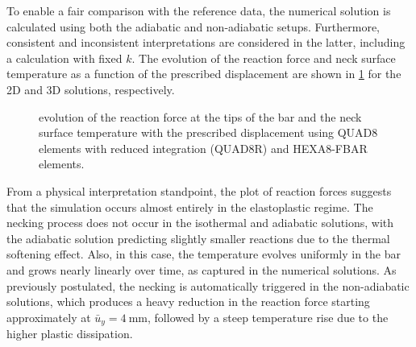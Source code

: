 To enable a fair comparison with the reference data, the numerical solution is calculated using both the adiabatic and non-adiabatic setups.
Furthermore, consistent and inconsistent interpretations are considered in the latter, including a calculation with fixed $k$.
The evolution of the reaction force and neck surface temperature as a function of the prescribed displacement are shown in \ref{fig:necking-results} for the 2D and 3D solutions, respectively.
\begin{figure}[!p]
 \centering
 \caption{evolution of the reaction force at the tips of the bar and the neck surface temperature with the prescribed displacement using QUAD8 elements with reduced integration (QUAD8R) and HEXA8-FBAR elements.}
 \label{fig:necking-results}
\end{figure}
%
From a physical interpretation standpoint, the plot of reaction forces suggests that the simulation occurs almost entirely in the elastoplastic regime.
The necking process does not occur in the isothermal and adiabatic solutions, with the adiabatic solution predicting slightly smaller reactions due to the thermal softening effect.
Also, in this case, the temperature evolves uniformly in the bar and grows nearly linearly over time, as captured in the numerical solutions.
As previously postulated, the necking is automatically triggered in the non-adiabatic solutions, which produces a heavy reduction in the reaction force starting approximately at $\bar{u}_{y}=\SI{4}{\milli\meter}$, followed by a steep temperature rise due to the higher plastic dissipation.

